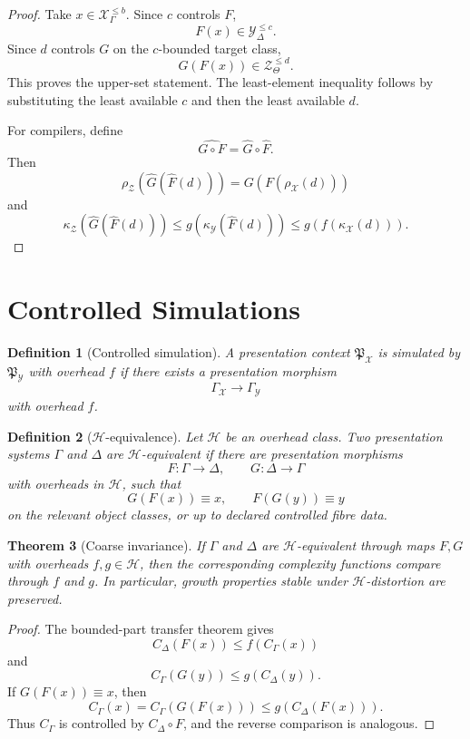 \documentclass[11pt]{article}
\newtheorem{theorem}{Theorem}[section]
\newtheorem{definition}[theorem]{Definition}
\begin{document}
\begin{proof}
Take \(x\in\mathcal X_\Gamma^{\leq b}\). Since \(c\) controls \(F\),
\[
F(x)\in\mathcal Y_\Delta^{\leq c}.
\]
Since \(d\) controls \(G\) on the \(c\)-bounded target class,
\[
G(F(x))\in\mathcal Z_\Theta^{\leq d}.
\]
This proves the upper-set statement. The least-element inequality follows by substituting the least available \(c\) and then the least available \(d\).

For compilers, define
\[
\widehat{G\circ F}=\widehat G\circ\widehat F.
\]
Then
\[
\rho_\mathcal Z(\widehat G(\widehat F(d)))
=
G(F(\rho_\mathcal X(d)))
\]
and
\[
\kappa_\mathcal Z(\widehat G(\widehat F(d)))
\leq
g(\kappa_\mathcal Y(\widehat F(d)))
\leq
g(f(\kappa_\mathcal X(d))).
\]
\end{proof}

\section{Controlled Simulations}

\begin{definition}[Controlled simulation]
A presentation context \(\mathfrak P_\mathcal X\) is simulated by \(\mathfrak P_\mathcal Y\) with overhead \(f\) if there exists a presentation morphism
\[
\Gamma_\mathcal X\to\Gamma_\mathcal Y
\]
with overhead \(f\).
\end{definition}

\begin{definition}[\(\mathcal H\)-equivalence]
Let \(\mathcal H\) be an overhead class. Two presentation systems \(\Gamma\) and \(\Delta\) are \(\mathcal H\)-equivalent if there are presentation morphisms
\[
F:\Gamma\to\Delta,\qquad G:\Delta\to\Gamma
\]
with overheads in \(\mathcal H\), such that
\[
G(F(x))\equiv x,\qquad F(G(y))\equiv y
\]
on the relevant object classes, or up to declared controlled fibre data.
\end{definition}

\begin{theorem}[Coarse invariance]
If \(\Gamma\) and \(\Delta\) are \(\mathcal H\)-equivalent through maps \(F,G\) with overheads \(f,g\in\mathcal H\), then the corresponding complexity functions compare through \(f\) and \(g\). In particular, growth properties stable under \(\mathcal H\)-distortion are preserved.
\end{theorem}

\begin{proof}
The bounded-part transfer theorem gives
\[
C_\Delta(F(x))\leq f(C_\Gamma(x))
\]
and
\[
C_\Gamma(G(y))\leq g(C_\Delta(y)).
\]
If \(G(F(x))\equiv x\), then
\[
C_\Gamma(x)
=
C_\Gamma(G(F(x)))
\leq
g(C_\Delta(F(x))).
\]
Thus \(C_\Gamma\) is controlled by \(C_\Delta\circ F\), and the reverse comparison is analogous.
\end{proof}
\end{document}

